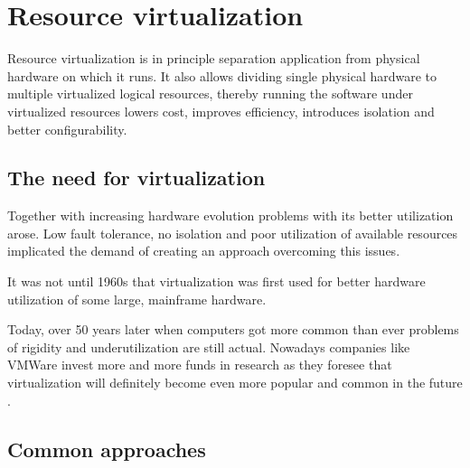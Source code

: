 \documentclass[11pt]{book}
\begin{document}



    \section{Resource virtualization}
    \label{sec:ctx:virt}

      Resource virtualization is in principle separation application from physical hardware on which it runs. It also
      allows dividing single physical hardware to multiple virtualized logical resources, thereby running the software
      under virtualized resources lowers cost, improves efficiency, introduces isolation and better configurability. 


      \subsection{The need for virtualization}

        Together with increasing hardware evolution problems with its better utilization arose. Low fault tolerance, no
        isolation and poor utilization of available resources implicated the demand of creating an approach overcoming
        this issues. 

        It was not until 1960s that virtualization was first used for better hardware utilization of some large,
        mainframe hardware.
	
        Today, over 50 years later when computers got more common than ever problems of rigidity and underutilization
        are still actual. Nowadays companies like VMWare invest more and more funds in research as they foresee that
        virtualization will definitely become even more popular and common in the future \cite{virtualization}.



      \subsection{Common approaches}
\end{document}
